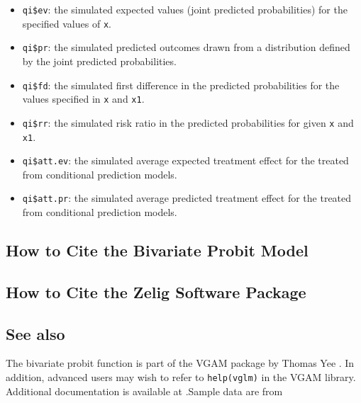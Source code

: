 \begin{itemize}
   \begin{itemize}
   \item {\tt qi\$ev}: the simulated expected values (joint predicted
     probabilities) for the specified values of {\tt x}.
   \item {\tt qi\$pr}: the simulated predicted outcomes drawn from a
     distribution defined by the joint predicted probabilities.
   \item {\tt qi\$fd}: the simulated first difference in the predicted
     probabilities for the values specified in {\tt x} and {\tt x1}.
   \item {\tt qi\$rr}: the simulated risk ratio in the predicted
     probabilities for given {\tt x} and {\tt x1}.
   \item {\tt qi\$att.ev}: the simulated average expected treatment
     effect for the treated from conditional prediction models.  
   \item {\tt qi\$att.pr}: the simulated average predicted treatment
     effect for the treated from conditional prediction models.  
   \end{itemize}
\end{itemize}

\subsection*{How to Cite the Bivariate Probit Model}

\subsection*{How to Cite the Zelig Software Package}
\CiteZelig


\subsection*{See also}
The bivariate probit function is part of the VGAM package by Thomas Yee \citep{YeeHas03}. In addition, advanced users may wish to refer to \texttt{help(vglm)} 
in the VGAM library.  Additional documentation is available at
.Sample data are from \cite{Martin92}




 
